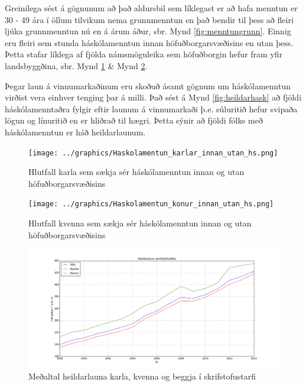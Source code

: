 \documentclass[12pt, git, draft]{rureport}
\begin{document}
Greinilega sést á gögnunum að það aldursbil sem líklegast er að hafa menntun er 30 - 49 ára í öllum tilvikum nema grunnmenntun en það bendir til þess að fleiri ljúka grunnmenntun nú en á árum áður, sbr. Mynd \ref{fig:menntungrunn}. Einnig eru fleiri sem stunda háskólamenntun innan höfuðborgarsvæðisins en utan þess. Þetta stafar líklega af fjölda námsmöguleika sem höfuðborgin hefur fram yfir landsbyggðina, sbr.  Mynd \ref{fig:menntukarla} \& Mynd \ref{fig:menntunkonur}.

Þegar laun á vinnumarkaðinum eru skoðuð ásamt gögnum um háskólamenntun virðist vera einhver tenging þar á milli. Það sést á Mynd \ref{fig:heildarhask} að fjöldi háskólamenntaðra fylgir eftir launum á vinnumarkaði þ.e. súluritið hefur svipaða lögun og línuritið en er hliðrað til hægri. Þetta sýnir að fjöldi fólks með háskólamenntun er háð heildarlaunum.

\pagebreak

\begin{figure}
	\centering 
	\texttt{[image: ../graphics/Haskolamentun\_karlar\_innan\_utan\_hs.png]}
	\caption{Hlutfall karla sem sækja sér háskólamenntun innan og utan höfuðborgarsvæðisins \label{fig:menntukarla}}
\end{figure}

\begin{figure}
	\centering 
	\texttt{[image: ../graphics/Haskolamentun\_konur\_innan\_utan\_hs.png]}
	\caption{Hlutfall kvenna sem sækja sér háskólamenntun innan og utan höfuðborgarsvæðisins\label{fig:menntunkonur}}
\end{figure}

\begin{figure}
	\centering 
	\includegraphics[width=\textwidth]{graphics/heildar_laun.png}
	\caption{Meðaltal heildarlauna karla, kvenna og beggja í skrifstofustarfi \label{fig:heildarlaun}}
\end{figure}
\end{document}
